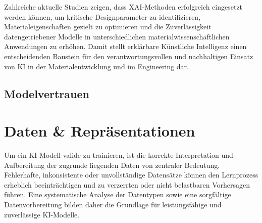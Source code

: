 Zahlreiche aktuelle Studien zeigen, dass XAI‑Methoden erfolgreich eingesetzt werden können, um kritische Designparameter zu identifizieren, Materialeigenschaften gezielt zu optimieren und die Zuverlässigkeit datengetriebener Modelle in unterschiedlichen materialwissenschaftlichen Anwendungen zu erhöhen. Damit stellt erklärbare Künstliche Intelligenz einen entscheidenden Baustein für den verantwortungsvollen und nachhaltigen Einsatz von KI in der Materialentwicklung und im Engineering dar. \cite{liu2021stochastic} \cite{liu2022surrogate}





\subsection{Modelvertrauen}

\section{Daten \& Repräsentationen}
Um ein KI-Modell valide zu trainieren, ist die korrekte Interpretation und Aufbereitung der zugrunde liegenden Daten von zentraler Bedeutung. Fehlerhafte, inkonsistente oder unvollständige Datensätze können den Lernprozess erheblich beeinträchtigen und zu verzerrten oder nicht belastbaren Vorhersagen führen. Eine systematische Analyse der Datentypen sowie eine sorgfältige Datenvorbereitung bilden daher die Grundlage für leistungsfähige und zuverlässige KI-Modelle.

